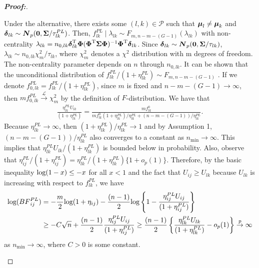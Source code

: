\documentclass[times,sort&compress,3p]{elsarticle}
\theoremstyle{plain}%
\theoremstyle{definition}
\def\log{\hbox{log}}
\def\log{\hbox{log}}
\def\be{\begin{eqnarray}}
\def\ee{\end{eqnarray}}
\def\trans{^{\rm T}}
\newcommand{\uN}       {\mbox{\boldmath$N$}}
\newcommand{\udelta}            {\mbox{\boldmath$\delta$}}
\newcommand{\umu}               {\mbox{\boldmath$\mu$}}
\newcommand{\uSigma}            {\mbox{\boldmath$\Sigma$}}
\newcommand{\uPhi}              {\mbox{\boldmath$\Phi$}}
\begin{document}
\begin{proof}[\textbf{\upshape Proof:}]
\begin{description}
Under the alternative, 
there exists some $(l, k)\in\mathcal{P}$ such that
$\umu_{l} \neq \umu_{k}$ and $\udelta_{lk} \sim \uN_{p}({\bf 0}, \uSigma /\tau^{PL}_{lk})$.
Then, $f_{lk}^{PL} \mid   \lambda_{lk} \sim F_{m, n-m-(G-1)}(\lambda_{lk})$
with non-centrality $\lambda_{lk} = n_{0,lk}\udelta_{lk}\trans\uPhi(\uPhi\trans \uSigma \uPhi)^{-1}\uPhi\trans \udelta_{lk}$.
Since $\udelta_{lk} \sim \uN_{p}({\bf 0}, \uSigma /\tau_{lk})$, $\lambda_{lk} \sim n_{0,lk}\chi_{m}^{2}/\tau_{lk}$,
where $\chi_{m}^{2}$ denotes a $\chi^{2}$ distribution with m degrees of freedom. The non-centrality parameter depends on $n$ through $n_{0,lk}$.
It can be shown that the unconditional distribution of $f_{lk}^{PL} /(1 + \eta^{PL}_{lk}) \sim F_{m, n-m-(G-1)}$ \citep[see for reference][page 704]{johnson2005bayes}.
If we denote $f_{0,lk}^{PL} =  f_{lk}^{PL} /(1 + \eta^{PL}_{lk})$, since $m$ is fixed and $n - m - (G - 1)\to\infty$, then $mf_{0,lk}^{PL}\overset{\mathcal{L}}{\to}\chi_m^2$ by the definition of $F$-distribution. We have that
\be
\frac{\eta^{PL}_{lk} U_{lk}}{(1+\eta^{PL}_{lk})} = \frac{ m f_{lk}^{0}}{m f_{lk}^{0}(1+\eta^{PL}_{lk})/\eta_{lk}^{PL}+(n-m-(G-1))/\eta_{lk}^{PL}} \nonumber.
\ee
Because $\eta_{lk}^{PL}\to\infty$, then $(1+\eta^{PL}_{lk})/\eta_{lk}^{PL}\to 1$ and by Assumption 1, $(n - m - (G - 1))/\eta_{lk}^{PL}$ also converges to a constant as $n_{\min}\to\infty$. 
This implies that $\eta^{PL}_{lk} U_{lk}/(1+\eta^{PL}_{lk})$ is bounded below in probability. Also, observe that $\eta_{ij}^{PL}/(1 + \eta_{ij}^{PL}) = \eta_{lk}^{PL}/(1 + \eta_{lk}^{PL})\{1 + o_p(1)\}$.
Therefore, by the basic inequality $\log(1 - x)\leq -x$ for all $x < 1$ and the fact that $U_{ij}\geq U_{lk}$ because $U_{lk}$ is increasing with respect to $f_{lk}^{PL}$, we have
\begin{align*}
    \log({BF}_{ij}^{PL})
    & = -\frac{m}{2}\log(1 + \eta_{ij}) - \frac{(n - 1)}{2}\log \left\{1 - \frac{\eta^{PL}_{ij} U_{ij}}{(1+\eta^{PL}_{ij})}\right\}\\
    &\geq -C\sqrt{n} + \frac{(n - 1)}{2}\frac{\eta^{PL}_{ij} U_{ij}}{(1+\eta^{PL}_{ij})}
    \geq \frac{(n - 1)}{2}\left\{\frac{\eta^{PL}_{lk} U_{lk}}{(1+\eta^{PL}_{lk})} - o_p(1)\right\}\overset{p}{\to}\infty
\end{align*}
as $n_{\min}\to\infty$, where $C > 0$ is some constant. 

\end{description}
\end{proof}
\end{document}
